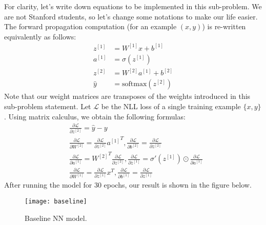 \begin{answer}
For clarity, let's write down equations to be implemented in this sub-problem. We are not Stanford students, so let's change some notations to make our life easier. The forward propagation computation (for an example $(x,y)$) is re-written equivalently as follows:
\begin{align}
	z^{[1]} &= W^{[1]}x + b^{[1]} \\
	a^{[1]} &= \sigma(z^{[1]}) \\
	z^{[2]}  &= W^{[2]} a^{[1]} + b^{[2]} \\
	\hat{y} &= \text{softmax}(z^{[2]})
\end{align}
Note that our weight matrices are transposes of the weights introduced in this sub-problem statement. Let $\mathcal{L}$ be the NLL loss of a single training example $\{x,y\}$. Using matrix calculus, we obtain the following formulas:
\begin{align}
	& \frac{\partial\mathcal{L}}{\partial z^{[2]}} = \hat{y} - y \\
	& \frac{\partial\mathcal{L}}{\partial W^{[2]}} = \frac{\partial\mathcal{L}}{\partial z^{[2]}} {a^{[1]}}^T, \frac{\partial\mathcal{L}}{\partial b^{[2]}} = \frac{\partial\mathcal{L}}{\partial z^{[2]}} \\
	& \frac{\partial\mathcal{L}}{\partial a^{[1]}} = {W^{[2]}}^T \frac{\partial\mathcal{L}}{\partial z^{[2]}}, \frac{\partial\mathcal{L}}{\partial z^{[1]}} = \sigma'(z^{[1]}) \odot \frac{\partial\mathcal{L}}{\partial a^{[1]}}\\
	&\frac{\partial\mathcal{L}}{\partial W^{[1]}} = \frac{\partial\mathcal{L}}{\partial z^{[1]}} x^T, \frac{\partial\mathcal{L}}{\partial b^{[1]}} = \frac{\partial\mathcal{L}}{\partial z^{[1]}}
\end{align}
After running the model for 30 epochs, our result is shown in the figure below.
\begin{figure}[H]
	\centering
	\texttt{[image: baseline]}
	\caption{Baseline NN model.}
\end{figure}
\end{answer}
   
 
 
 
 
 
 
 
 
 
 
 
 
 
 
 
 
 
 
 
 
 
 
 
 
 
